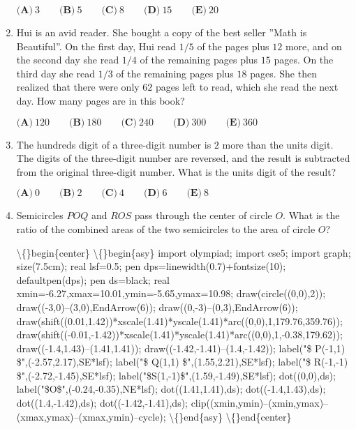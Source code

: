 \documentclass{article}
\begin{document}
\begin{enumerate}[label=\arabic*., itemsep=0.5em]
\( \textbf{(A)}\ 3 \qquad\textbf{(B)}\ 5\qquad\textbf{(C)}\ 8\qquad\textbf{(D)}\ 15\qquad\textbf{(E)}\ 20 \)\par \vspace{0.5em}\item Hui is an avid reader. She bought a copy of the best seller ''Math is Beautiful''. On the first day, Hui read \(1/5\) of the pages plus \(12\) more, and on the second day she read \(1/4\) of the remaining pages plus \(15\) pages. On the third day she read \(1/3\) of the remaining pages plus \(18\) pages. She then realized that there were only \(62\) pages left to read, which she read the next day. How many pages are in this book? 

\( \textbf{(A)}\ 120 \qquad\textbf{(B)}\ 180\qquad\textbf{(C)}\ 240\qquad\textbf{(D)}\ 300\qquad\textbf{(E)}\ 360 \)\par \vspace{0.5em}\item The hundreds digit of a three-digit number is \(2\) more than the units digit. The digits of the three-digit number are reversed, and the result is subtracted from the original three-digit number. What is the units digit of the result?

\( \textbf{(A)}\ 0 \qquad\textbf{(B)}\ 2\qquad\textbf{(C)}\ 4\qquad\textbf{(D)}\ 6\qquad\textbf{(E)}\ 8 \)\par \vspace{0.5em}\item Semicircles \(POQ\) and \(ROS\) pass through the center of circle \(O\). What is the ratio of the combined areas of the two semicircles to the area of circle \(O\)?  

\textbackslash\{\}begin\{center\}
\textbackslash\{\}begin\{asy\}
import olympiad;
import cse5;
import graph; size(7.5cm); real lsf=0.5; pen dps=linewidth(0.7)+fontsize(10); defaultpen(dps); pen ds=black; real xmin=-6.27,xmax=10.01,ymin=-5.65,ymax=10.98; draw(circle((0,0),2)); draw((-3,0)--(3,0),EndArrow(6)); draw((0,-3)--(0,3),EndArrow(6)); draw(shift((0.01,1.42))*xscale(1.41)*yscale(1.41)*arc((0,0),1,179.76,359.76)); draw(shift((-0.01,-1.42))*xscale(1.41)*yscale(1.41)*arc((0,0),1,-0.38,179.62)); draw((-1.4,1.43)--(1.41,1.41)); draw((-1.42,-1.41)--(1.4,-1.42)); label("\$ P(-1,1) \$",(-2.57,2.17),SE*lsf); label("\$ Q(1,1) \$",(1.55,2.21),SE*lsf); label("\$ R(-1,-1) \$",(-2.72,-1.45),SE*lsf); label("\$S(1,-1)\$",(1.59,-1.49),SE*lsf); 
dot((0,0),ds); label("\$O\$",(-0.24,-0.35),NE*lsf); dot((1.41,1.41),ds); dot((-1.4,1.43),ds); dot((1.4,-1.42),ds); dot((-1.42,-1.41),ds); 
clip((xmin,ymin)--(xmin,ymax)--(xmax,ymax)--(xmax,ymin)--cycle);
\textbackslash\{\}end\{asy\}
\textbackslash\{\}end\{center\}


\end{enumerate}
\end{document}
